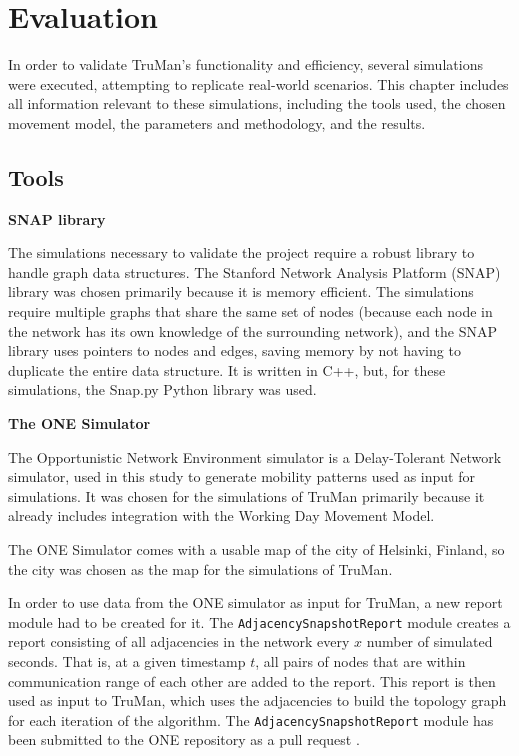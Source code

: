 \chapter{Evaluation}
\label{chap:simulations}

In order to validate TruMan's functionality and efficiency, several simulations were executed, attempting to replicate real-world scenarios.
This chapter includes all information relevant to these simulations, including the tools used, the chosen movement model, the parameters and methodology, and the results.

\section{Tools}
\label{section:tools}

\textbf{SNAP library}

The simulations necessary to validate the project require a robust library to handle graph data structures.
The Stanford Network Analysis Platform (SNAP) library \citep{snap} was chosen primarily because it is memory efficient.
The simulations require multiple graphs that share the same set of nodes (because each node in the network has its own knowledge of the surrounding network), and the SNAP library uses pointers to nodes and edges, saving memory by not having to duplicate the entire data structure.
It is written in C++, but, for these simulations, the Snap.py Python library was used.

\textbf{The ONE Simulator}

The Opportunistic Network Environment simulator \citep{keranen2009one} \citep{onerepo} is a Delay-Tolerant Network simulator, used in this study to generate mobility patterns used as input for simulations.
It was chosen for the simulations of TruMan primarily because it already includes integration with the Working Day Movement Model.

The ONE Simulator comes with a usable map of the city of Helsinki, Finland, so the city was chosen as the map for the simulations of TruMan.

In order to use data from the ONE simulator as input for TruMan, a new report module had to be created for it.
The \texttt{AdjacencySnapshotReport} module creates a report consisting of all adjacencies in the network every $x$ number of simulated seconds.
That is, at a given timestamp $t$, all pairs of nodes that are within communication range of each other are added to the report.
This report is then used as input to TruMan, which uses the adjacencies to build the topology graph for each iteration of the algorithm.
The \texttt{AdjacencySnapshotReport} module has been submitted to the ONE repository as a pull request \citep{adjacencypull}.


